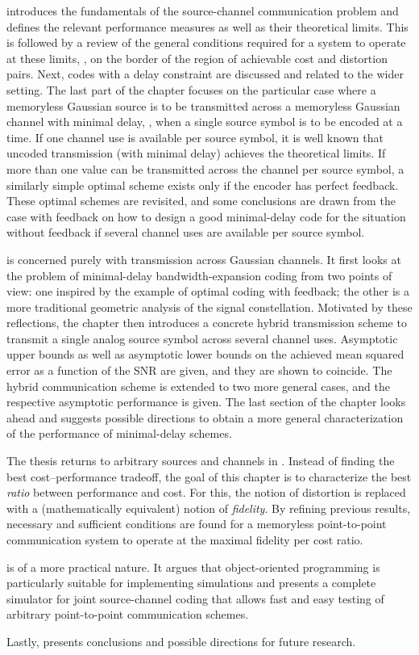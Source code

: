 introduces the fundamentals of the source-channel
communication problem and defines the relevant performance measures as well as
their theoretical limits.  This is followed by a review of the general
conditions required for a system to operate at these limits, \ie, on the border
of the region of achievable cost and distortion pairs. Next, codes with a delay
constraint are discussed and related to the wider setting. The last part of the
chapter focuses on the particular case where a memoryless Gaussian source is to
be transmitted across a memoryless Gaussian channel with minimal delay, \ie,
when a single source symbol is to be encoded at a time. If one channel use is
available per source symbol, it is well known that uncoded transmission (with
minimal delay) achieves the theoretical limits. If more than one value can be
transmitted across the channel per source symbol, a similarly simple optimal
scheme exists only if the encoder has perfect feedback. These optimal schemes
are revisited, and some conclusions are drawn from the case with feedback on how
to design a good minimal-delay code for the situation without feedback if
several channel uses are available per source symbol.

 is concerned purely with transmission across Gaussian
channels. It first looks at the problem of minimal-delay bandwidth-expansion
coding from two points of view: one inspired by the example of optimal coding
with feedback; the other is a more traditional geometric analysis of the signal
constellation. Motivated by these reflections, the chapter then introduces a
concrete hybrid transmission scheme to transmit a single analog source symbol
across several channel uses.  Asymptotic upper bounds as well as asymptotic
lower bounds on the achieved mean squared error as a function of the SNR are
given, and they are shown to coincide. The hybrid communication scheme is
extended to two more general cases, and the respective asymptotic performance is
given. The last section of the chapter looks ahead and suggests possible
directions to obtain a more general characterization of the performance of
minimal-delay schemes. 

The thesis returns to arbitrary sources and channels in .
Instead of finding the best cost--performance tradeoff, the goal of this chapter
is to characterize the best \emph{ratio} between performance and cost. For this,
the notion of distortion is replaced with a (mathematically equivalent) notion
of \emph{fidelity}. By refining previous results, necessary and sufficient
conditions are found for a memoryless point-to-point communication system to
operate at the maximal fidelity per cost ratio. 

 is of a more practical nature. It argues that
object-oriented programming is particularly suitable for implementing
simulations and presents a complete simulator for joint source-channel coding
that allows fast and easy testing of arbitrary point-to-point communication
schemes. 

Lastly,  presents conclusions and possible directions for
future research.


